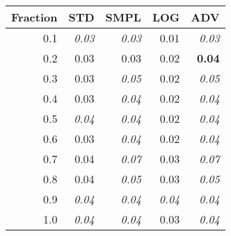 \documentclass{standalone}
\begin{document}
\begin{tabular}{r|rrrr}
      \toprule
      Fraction & STD & SMPL & LOG & ADV\\
      \midrule
      0.1 & \emph{0.03} & \emph{0.03} & 0.01 & \emph{0.03}\\
  0.2 & 0.03 & 0.03 & 0.02 & \textbf{0.04}\\
  0.3 & 0.03 & \emph{0.05} & 0.02 & \emph{0.05}\\
  0.4 & 0.03 & \emph{0.04} & 0.02 & \emph{0.04}\\
  0.5 & \emph{0.04} & \emph{0.04} & 0.02 & \emph{0.04}\\
  0.6 & 0.03 & \emph{0.04} & 0.02 & \emph{0.04}\\
  0.7 & 0.04 & \emph{0.07} & 0.03 & \emph{0.07}\\
  0.8 & 0.04 & \emph{0.05} & 0.03 & \emph{0.05}\\
  0.9 & \emph{0.04} & \emph{0.04} & \emph{0.04} & \emph{0.04}\\
  1.0 & \emph{0.04} & \emph{0.04} & 0.03 & \emph{0.04}\\
  \bottomrule
\end{tabular}
\end{document}
